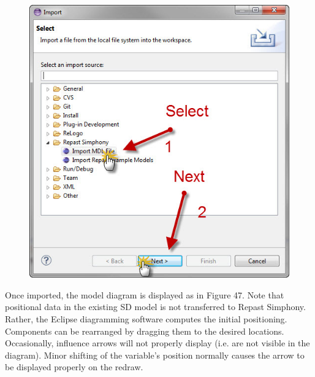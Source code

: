 \documentclass[11pt]{amsart}
\begin{document}
\clearpage

\begin{figure}[ht]
\begin{center}
\vspace{.2in}
\centerline {
\includegraphics[totalheight=0.3\textheight]{images/046.jpg}
}
\caption{}
\label{fig:046}
\end{center}
\end{figure}

Once imported, the model diagram is displayed as in Figure 47. Note that positional data in the existing SD model is not transferred to Repast Simphony. Rather, the Eclipse diagramming software computes the initial positioning. Components can be rearranged by dragging them to the desired locations. Occasionally, influence arrows will not properly display (i.e. are not visible in the diagram). Minor shifting of the variable’s position normally causes the arrow to be displayed properly on the redraw.
\end{document}
